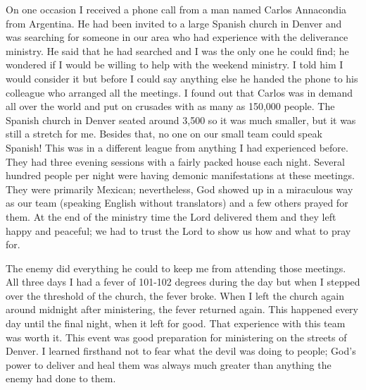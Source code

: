\documentclass[oneside]{book}
\begin{document}
On one occasion I received a phone call from a man named Carlos Annacondia from Argentina. He had been invited to a large Spanish church in Denver and was searching for someone in our area who had experience with the deliverance ministry. He said that he had searched and I was the only one he could find; he wondered if I would be willing to help with the weekend ministry. I told him I would consider it but before I could say anything else he handed the phone to his colleague who arranged all the meetings. I found out that Carlos was in demand all over the world and put on crusades with as many as 150,000 people. The Spanish church in Denver seated around 3,500 so it was much smaller, but it was still a stretch for me. Besides that, no one on our small team could speak Spanish! This was in a different league from anything I had experienced before. They had three evening sessions with a fairly packed house each night. Several hundred people per night were having demonic manifestations at these meetings. They were primarily Mexican; nevertheless, God showed up in a miraculous way as our team (speaking English without translators) and a few others prayed for them. At the end of the ministry time the Lord delivered them and they left happy and peaceful; we had to trust the Lord to show us how and what to pray for. 

The enemy did everything he could to keep me from attending those meetings. All three days I had a fever of 101-102 degrees during the day but when I stepped over the threshold of the church, the fever broke. When I left the church again around midnight after ministering, the fever returned again. This happened every day until the final night, when it left for good. That experience with this team was worth it. This event was good preparation for ministering on the streets of Denver. I learned firsthand not to fear what the devil was doing to people; God’s power to deliver and heal them was always much greater than anything the enemy had done to them. 
\end{document}
